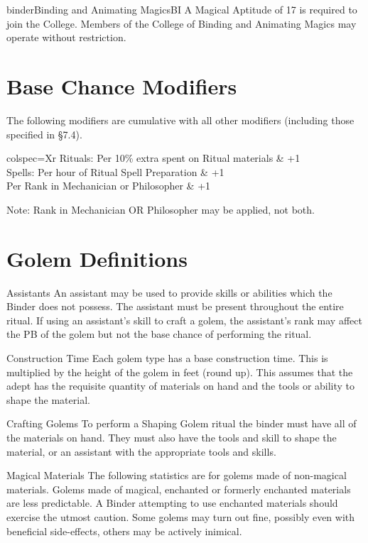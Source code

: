 \begin{College}[1.2]{binder}{Binding and Animating Magics}{BI}
A Magical Aptitude of 17 is required to join the College.  Members of
the College of Binding and Animating Magics may operate without
restriction.

\section{Base Chance Modifiers}

The following modifiers are cumulative with all other modifiers
(including those specified in §7.4).

\begin{dqtblr}{colspec={Xr}}
Rituals: Per 10\% extra spent on Ritual materials	& +1 \\
Spells: Per hour of Ritual Spell Preparation		& +1 \\
Per Rank in Mechanician or Philosopher			& +1 \\
\end{dqtblr}

Note: Rank in Mechanician OR Philosopher may be applied, not both.


\section{Golem Definitions}

\begin{Description}
\item[Assistants] An assistant may be used to provide skills or
  abilities which the Binder does not possess.  The assistant must be
  present throughout the entire ritual.  If using an assistant’s skill
  to craft a golem, the assistant’s rank may affect the PB of the
  golem but not the base chance of performing the ritual.

\item[Construction Time] Each golem type has a base construction time.
  This is multiplied by the height of the golem in feet (round
  up). This assumes that the adept has the requisite quantity of
  materials on hand and the tools or ability to shape the material.

\item[Crafting Golems] To perform a Shaping Golem ritual the binder
  must have all of the materials on hand.  They must also have the
  tools and skill to shape the material, or an assistant with the
  appropriate tools and skills.

\item[Magical Materials] The following statistics are for golems made
  of non-magical materials.  Golems made of magical, enchanted or
  formerly enchanted materials are less predictable. A Binder
  attempting to use enchanted materials should exercise the utmost
  caution.  Some golems may turn out fine, possibly even with
  beneficial side-effects, others may be actively inimical.


\end{Description}
\end{College}
